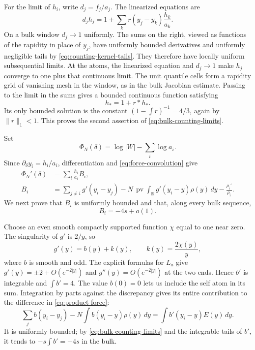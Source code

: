 For the limit of \(h_i\), write \(d_j=f_j/a_j\). The linearized equations are
\[
 d_j h_j=1+\sum_k r(y_j-y_k)\frac{h_k}{a_k}.
\]
On a bulk window \(d_j\to1\) uniformly. The sums on the right, viewed as functions of the rapidity in place of \(y_j\), have uniformly bounded derivatives and uniformly negligible tails by
\eqref{eq:counting-kernel-tails}. They therefore have locally uniform subsequential limits. At the atoms, the linearized equation and \(d_j\to1\) make \(h_j\) converge to one plus that continuous limit. The unit quantile cells form a rapidity grid of vanishing mesh in the window, as in the bulk Jacobian estimate. Passing to the limit in the sums gives a bounded continuous function satisfying
\[
 h_*=1+r*h_*.
\]
Its only bounded solution is the constant
\((1-\int r)^{-1}=4/3\), again by \(\|r\|_1<1\). This proves the second assertion of \eqref{eq:bulk-counting-limits}.

Set
\[
 \Phi_N(\delta)=\log|W|-\sum_i\log a_i.
\]
Since \(\partial_\delta y_i=h_i/a_i\), differentiation and
\eqref{eq:force-convolution} give
\begin{equation}\label{eq:product-force}
 \begin{aligned}
 \Phi_N'(\delta)&=\sum_i\frac{h_i}{a_i}B_i,\\
 B_i&=\sum_{j\ne i}g'(y_i-y_j)
       -N\,\operatorname{pv}\!\int_{\mathbb R}g'(y_i-y)\rho(y)\,dy
       -\frac{\rho_i'}{\rho_i}.
 \end{aligned}
\end{equation}
We next prove that \(B_i\) is uniformly bounded and that, along every bulk sequence,
\begin{equation}\label{eq:bulk-force}
 B_i=-4s+o(1).
\end{equation}

Choose an even smooth compactly supported function \(\chi\) equal to one near zero. The singularity of \(g'\) is \(2/y\), so
\[
 g'(y)=b(y)+k(y),\qquad k(y)=\frac{2\chi(y)}y,
\]
where \(b\) is smooth and odd. The explicit formulas for \(L_a\) give
\(g'(y)=\pm2+O(e^{-2|y|})\) and \(g''(y)=O(e^{-2|y|})\) at the two ends. Hence \(b'\) is integrable and \(\int b'=4\). The value \(b(0)=0\) lets us include the self atom in its sum. Integration by parts against the discrepancy gives its entire contribution to the difference in \eqref{eq:product-force}:
\[
 \sum_j b(y_i-y_j)-N\int b(y_i-y)\rho(y)\,dy
 =\int b'(y_i-y)E(y)\,dy.
\]
It is uniformly bounded; by \eqref{eq:bulk-counting-limits} and the integrable tails of \(b'\), it tends to \(-s\int b'=-4s\) in the bulk.

